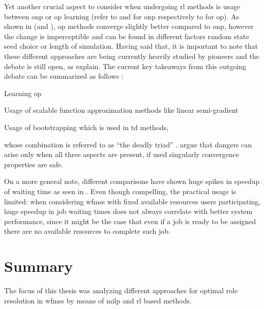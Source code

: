 Yet another crucial aspect to consider when undergoing \gls{rl} methods is usage between \gls{onp} or \gls{op} learning (refer to  and  for \gls{onp} respectively to  for \gls{op}). As shown in  (and ), \gls{op} methods converge slightly better compared to \gls{onp}, however the change is imperceptible and can be found in different factors \eg random state seed choice or length of simulation. Having said that, it is important to note that these different approaches are being currently heavily studied by pioneers and the debate is still open, as \citet[pp. 245--249]{Sutton2017} explain. The current key takeaways from this outgoing debate can be summarized as follows \citep{Sutton2017}:
\begin{enumerate*}
	\item Learning \gls{op}
	\item Usage of scalable function approximation methods like linear semi-gradient 
	\item Usage of bootstrapping which is used in \gls{td} methods,
\end{enumerate*}
whose combination is referred to as ``the deadly triad'' \citep[p. 249]{Sutton2017}. \citet[p. 249]{Sutton2017} argue that dangers can arise only when all three aspects are present, if used singularly convergence properties are safe.

On a more general note, different comparisons have shown huge spikes in speedup of waiting time \eg as seen in . Even though compelling, the practical usage is limited: when considering \glspl{wfms} with fixed available resources \ie users participating, huge speedup in job waiting times does not always correlate with better system performance, since it might be the case that even if a job is ready to be assigned there are no available resources to complete such job.


\section{Summary}
\label{sec:summary}

The focus of this thesis was analyzing different approaches for optimal role resolution in \glspl{wfms} by means of \gls{milp} and \gls{rl} based methods.

